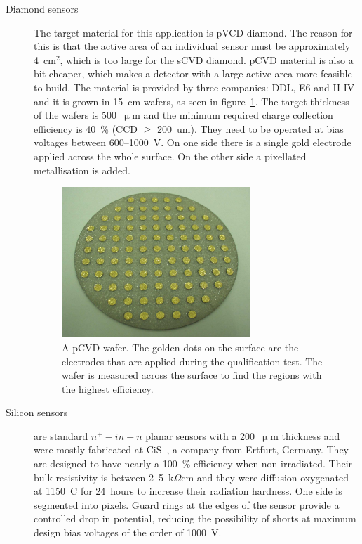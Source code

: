 \documentclass[twoside,12pt]{packages/mytustyle}  %
\begin{document}
 
\begin{description}
\item[Diamond sensors] The target material for this application is pVCD diamond. The reason for this is that the active area of an individual sensor must be approximately 4~cm$^2$, which is too large for the sCVD diamond. pCVD material is also a bit cheaper, which makes a detector with a large active area more feasible to build. The material is provided by three companies: DDL, E6 and II-IV and it is grown in 15~cm wafers, as seen in figure~\ref{fig:wafer}. The target thickness of the wafers is 500~$\upmu$m and the minimum required charge collection efficiency is 40~\% (CCD $\geq$ 200~um). They need to be operated at bias voltages between 600--1000~V. On one side there is a single gold electrode applied across the whole surface. On the other side a pixellated metallisation is added. 
\begin{figure}[!t]
\centering
\includegraphics[width=0.7\textwidth]{pics/wafer}
\caption{A pCVD wafer. The golden dots on the surface are the electrodes that are applied during the qualification test. The wafer is measured across the surface to find the regions with the highest efficiency.}
\label{fig:wafer}
\end{figure}
\item[Silicon sensors] are standard $n^+ - in - n$ planar sensors with a 200~$\upmu$m thickness and were mostly fabricated at CiS~\cite{}, a company from Ertfurt, Germany. They are designed to have nearly a 100~\% efficiency when non-irradiated. Their bulk resistivity is between 2--5~k$\Omega$cm and they were diffusion oxygenated at 1150~\textdegree C for 24~hours to increase their radiation hardness. One side is segmented into pixels. Guard rings at the edges of the sensor provide a controlled drop in potential, reducing the possibility of shorts at maximum design bias voltages of the order of 1000~V.
\end{description}
\end{document}

